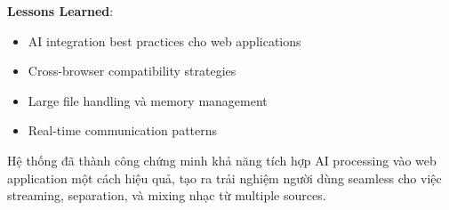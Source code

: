 \documentclass[12pt,a4paper]{article}
\begin{document}
\textbf{Lessons Learned}:
\begin{itemize}
\item AI integration best practices cho web applications
\item Cross-browser compatibility strategies
\item Large file handling và memory management
\item Real-time communication patterns
\end{itemize}

Hệ thống đã thành công chứng minh khả năng tích hợp AI processing vào web application một cách hiệu quả, tạo ra trải nghiệm người dùng seamless cho việc streaming, separation, và mixing nhạc từ multiple sources.
\end{document}
